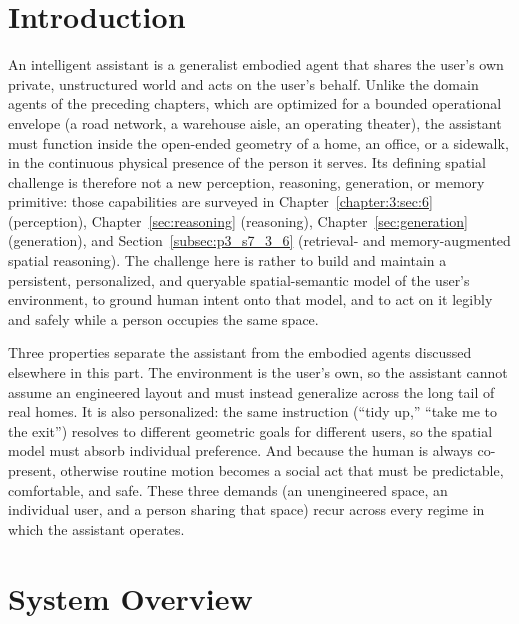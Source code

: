 


\section{Introduction}
\label{subsec:p4-sec13-1-introduction}\label{sec:p4_s13_1}

An intelligent assistant is a generalist embodied agent that shares the user's own private, unstructured world and acts on the user's behalf. 
Unlike the domain agents of the preceding chapters, which are optimized for a bounded operational envelope (a road network, a warehouse aisle, an operating theater), the assistant must function inside the open-ended geometry of a home, an office, or a sidewalk, in the continuous physical presence of the person it serves. 
Its defining spatial challenge is therefore not a new perception, reasoning, generation, or memory primitive: those capabilities are surveyed in Chapter~\ref{chapter:3:sec:6} (perception), Chapter~\ref{sec:reasoning} (reasoning), Chapter~\ref{sec:generation} (generation), and Section~\ref{subsec:p3_s7_3_6} (retrieval- and memory-augmented spatial reasoning).
The challenge here is rather to build and maintain a persistent, personalized, and queryable spatial-semantic model of the user's environment, to ground human intent onto that model, and to act on it legibly and safely while a person occupies the same space.

Three properties separate the assistant from the embodied agents discussed elsewhere in this part. The environment is the user's own, so the assistant cannot assume an engineered layout and must instead generalize across the long tail of real homes. 
It is also personalized: the same instruction (``tidy up,'' ``take me to the exit'') resolves to different geometric goals for different users, so the spatial model must absorb individual preference. 
And because the human is always co-present, otherwise routine motion becomes a social act that must be predictable, comfortable, and safe. These three demands (an unengineered space, an individual user, and a person sharing that space) recur across every regime in which the assistant operates.

\section{System Overview}
\label{subsec:p4-sec13-1-system-overview}

